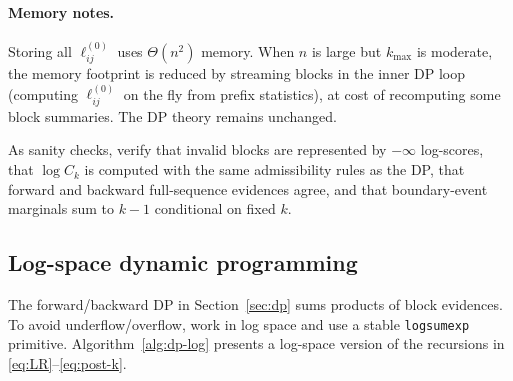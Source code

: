 \paragraph{Memory notes.}
Storing all $\ell^{(0)}_{ij}$ uses $\Theta(n^2)$ memory.
When $n$ is large but $k_{\max}$ is moderate, the memory footprint is reduced by streaming
blocks in the inner DP loop (computing $\ell^{(0)}_{ij}$ on the fly from prefix statistics), at
cost of recomputing some block summaries.
The DP theory remains unchanged.

As sanity checks, verify that invalid blocks are represented by $-\infty$ log-scores, that $\log C_k$ is computed with the same admissibility rules as the DP, that forward and backward full-sequence evidences agree, and that boundary-event marginals sum to $k-1$ conditional on fixed $k$.

\subsection{Log-space dynamic programming}
\label{sec:alg-dp-impl}

The forward/backward DP in Section~\ref{sec:dp} sums products of block evidences.
To avoid underflow/overflow, work in log space and use a stable
\texttt{logsumexp} primitive.
Algorithm~\ref{alg:dp-log} presents a log-space version of the recursions in
\eqref{eq:LR}--\eqref{eq:post-k}.


